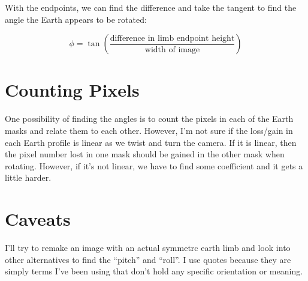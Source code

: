 \documentclass[10pt]{scrartcl}
\begin{document}
With the endpoints, we can find the difference and take the tangent to find the angle the Earth appears to be rotated:

\begin{equation}
    \phi = \tan{ \left(\frac{ \textrm{difference in limb endpoint height} }{\textrm{width of image}} \right)}
\end{equation}


\section{Counting Pixels} %
\label{sec:counting_pixels}
One possibility of finding the angles is to count the pixels in each of the Earth masks and relate them to each other. However, I'm not sure if the loss/gain in each Earth profile is linear as we twist and turn the camera. If it is linear, then the pixel number lost in one mask should be gained in the other mask when rotating. However, if it's not linear, we have to find some coefficient and it gets a little harder. 


\section{Caveats} %
\label{sec:caveats}
I'll try to remake an image with an actual symmetrc earth limb and look into other alternatives to find the ``pitch'' and ``roll''. I use quotes because they are simply terms I've been using that don't hold any specific orientation or meaning.
\end{document}
